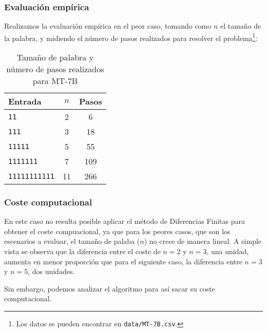 \subsubsection*{Evaluación empírica}
Realizamos la evaluación empírica en el peor caso, tomando como $n$ el tamaño de la palabra, y midiendo el número de pasos realizados para resolver el problema\footnote{Los datos se pueden encontrar en \texttt{data/MT-7B.csv}.}:

\begin{table}[h]
    \centering
    \begin{tabular}{lcc}
        Entrada & $n$ & Pasos \\
        \hline
        \texttt{11}            &  2  & 6   \\
        \texttt{111}           &  3  & 18  \\
        \texttt{11111}         &  5  & 55  \\
        \texttt{1111111}       &  7  & 109 \\
        \texttt{11111111111}   & 11  & 266 \\
    \end{tabular}
    \caption{Tamaño de palabra y número de pasos realizados para MT-7B}
\end{table}


\subsubsection*{Coste computacional}
En este caso no resulta posible aplicar el método de Diferencias Finitas para obtener el coste compuacional, ya que para los peores casos, que son los escenarios a evaluar, el tamaño de palaba ($n$) no crece de manera lineal. A simple vista se observa que la diferencia entre el coste de $n=2$ y $n=3$, una unidad, aumenta en menor proporción que para el siguiente caso, la diferencia entre $n=3$ y $n=5$, dos unidades.\medskip

Sin embargo, podemos analizar el algoritmo para así sacar su coste computacional.\medskip





